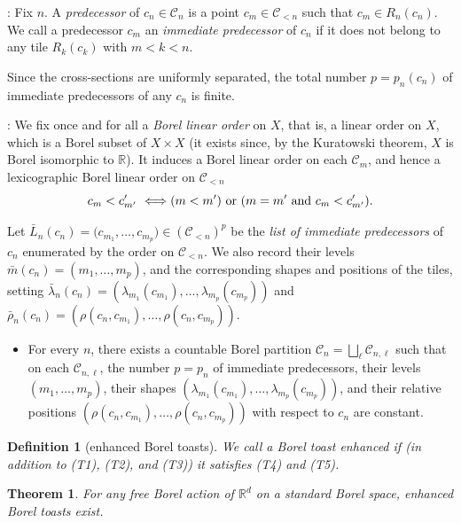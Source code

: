 \documentclass[11pt]{paper}
\newtheorem{theorem}{Theorem}
\newtheorem*{definition*}{Definition}
\newcommand{\bR}{\mathbb R}
\newcommand{\cC}{\mathcal C}
\begin{document}
\medskip{}:
Fix $n$. A {\em predecessor} of $c_n\in\cC_n$ is a point $c_m\in\cC_{<n}$
such that $c_m\in R_n(c_n)$. We call a predecessor $c_m$ an {\em immediate predecessor}
of $c_n$ if it does not belong to any tile $R_k(c_k)$ with $m<k<n$.

Since the cross-sections are uniformly separated,
the total number $p=p_n(c_n)$ of immediate predecessors of any $c_n$ is finite.

\medskip{}:
We fix once and for all a {\em Borel linear order} on $X$, that is, a linear order on $X$, which is a Borel subset of $X\times X$ (it exists since, by the Kuratowski theorem, $X$ is Borel isomorphic to $\bR$).
It induces a Borel linear order on each $\cC_m$, and hence
a lexicographic Borel linear order on $\cC_{<n}$
\[
c_m < c'_{m'} \ \Longleftrightarrow (m<m')\ {\rm or\ } (m=m'\ {\rm and\ } c_m < c_{m'}').
\]


Let $\bar L_n(c_n) = \bigl(  c_{m_1}, \ldots , c_{m_p} \bigr)
\in (\cC_{<n})^p $ be the {\em list of immediate predecessors} of $c_n$
enumerated by the order on $\cC_{<n}$.
We also record their levels $\bar m(c_n) = (m_1, \ldots , m_p)$, and
the  corresponding shapes and positions of the tiles, setting
$\bar\lambda_n (c_n) = ( \lambda_{m_1} (c_{m_1}), \ldots, \lambda_{m_p} (c_{m_p}) )$
and $\bar\rho_n(c_n) =  \left( \rho(c_n, c_{m_1}), \ldots , \rho (c_n, c_{m_p}) \right)$.

\begin{itemize}
\item[(T5)]
For every $n$, there exists a countable Borel partition $\cC_n = \bigsqcup_\ell \cC_{n, \ell}$
such that on each $\cC_{n, \ell}$,
the number $p=p_n$ of immediate predecessors,
their levels $(m_1, \ldots , m_p)$,
their shapes $ ( \lambda_{m_1} (c_{m_1}), \ldots, \lambda_{m_p} (c_{m_p}) )$,
and their relative positions $ ( \rho(c_n, c_{m_1}), \ldots , \rho (c_n, c_{m_p}) )$
with respect to $c_n$
are constant.
\end{itemize}


\begin{definition*}[enhanced Borel toasts]
{\rm We call a Borel toast} enhanced {\rm if (in addition to (T1), (T2), and (T3)) it satisfies (T4) and (T5)}.
\end{definition*}

\begin{theorem}\label{thm:toasts}
For any free Borel action of $\bR^d$ on a standard Borel space, enhanced Borel toasts exist.
\end{theorem}
\end{document}
